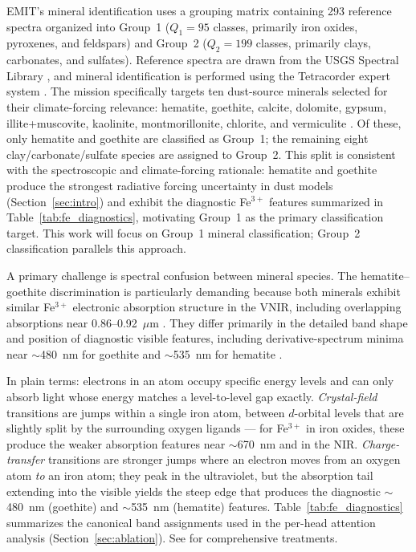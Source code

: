 \documentclass[preprint,12pt]{elsarticle}
\begin{document}
EMIT's mineral identification uses a grouping matrix containing 293 reference spectra organized into Group~1 ($Q_1 = 95$ classes, primarily iron oxides, pyroxenes, and feldspars) and Group~2 ($Q_2 = 199$ classes, primarily clays, carbonates, and sulfates).
Reference spectra are drawn from the USGS Spectral Library \cite{kokaly2017usgs}, and mineral identification is performed using the Tetracorder expert system \cite{emit_l2b_atbd, clark2003tetracorder}.
The mission specifically targets ten dust-source minerals selected for their climate-forcing relevance: hematite, goethite, calcite, dolomite, gypsum, illite+muscovite, kaolinite, montmorillonite, chlorite, and vermiculite \cite{emit_factsheet, emit_l3_atbd}.
Of these, only hematite and goethite are classified as Group~1; the remaining eight clay/carbonate/sulfate species are assigned to Group~2.
This split is consistent with the spectroscopic and climate-forcing rationale: hematite and goethite produce the strongest radiative forcing uncertainty in dust models (Section~\ref{sec:intro}) and exhibit the diagnostic Fe$^{3+}$ features summarized in Table~\ref{tab:fe_diagnostics}, motivating Group~1 as the primary classification target.
This work will focus on Group~1 mineral classification; Group~2 classification parallels this approach.

A primary challenge is spectral confusion between mineral species.
The hematite--goethite discrimination is particularly demanding because both minerals exhibit similar Fe$^{3+}$ electronic absorption structure in the VNIR, including overlapping absorptions near 0.86--0.92~$\mu$m \cite{clark1999,sherman1985}.
They differ primarily in the detailed band shape and position of diagnostic visible features, including derivative-spectrum minima near $\sim$480~nm for goethite and $\sim$535~nm for hematite \cite{Jiang2014AlGoethite}.

In plain terms: electrons in an atom occupy specific energy levels and can only absorb light whose energy matches a level-to-level gap exactly. \emph{Crystal-field} transitions are jumps within a single iron atom, between $d$-orbital levels that are slightly split by the surrounding oxygen ligands --- for Fe$^{3+}$ in iron oxides, these produce the weaker absorption features near $\sim$670~nm and in the NIR. \emph{Charge-transfer} transitions are stronger jumps where an electron moves from an oxygen atom \emph{to} an iron atom; they peak in the ultraviolet, but the absorption tail extending into the visible yields the steep edge that produces the diagnostic $\sim$480~nm (goethite) and $\sim$535~nm (hematite) features. Table~\ref{tab:fe_diagnostics} summarizes the canonical band assignments used in the per-head attention analysis (Section~\ref{sec:ablation}). See \cite{burns1993,clark1999,sherman1985,Jiang2014AlGoethite} for comprehensive treatments.
\end{document}
